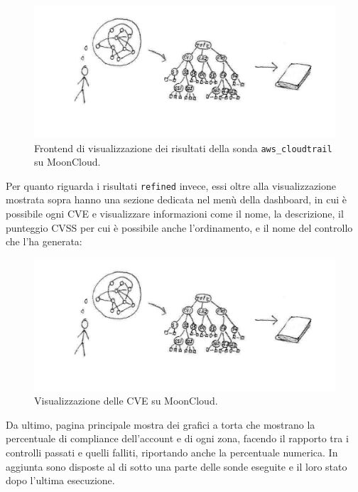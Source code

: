 \begin{center}
\begin{figure}
\centering
\includegraphics[width=\textwidth]{immagini/ideas2text.pdf}
\caption{Frontend di visualizzazione dei risultati della sonda \texttt{aws\_cloudtrail} su MoonCloud.}
\label{fig:awscloudtrailresult}
\end{figure}
\end{center}

Per quanto riguarda i risultati \texttt{refined} invece, essi oltre alla visualizzazione mostrata sopra hanno una sezione dedicata nel menù della dashboard, in cui è possibile ogni CVE e visualizzare informazioni come il nome, la descrizione, il punteggio CVSS per cui è possibile anche l'ordinamento, e il nome del controllo che l'ha generata: 

\begin{center}
\begin{figure}
\centering
\includegraphics[width=\textwidth]{immagini/ideas2text.pdf}
\caption{Visualizzazione delle CVE su MoonCloud.}
\label{fig:mooncloudcve}
\end{figure}
\end{center}

Da ultimo, pagina principale mostra dei grafici a torta che mostrano la percentuale di compliance dell'account e di ogni zona, facendo il rapporto tra i controlli passati e quelli falliti, riportando anche la percentuale numerica. In aggiunta sono disposte al di sotto una parte delle sonde eseguite e il loro stato dopo l'ultima esecuzione.

